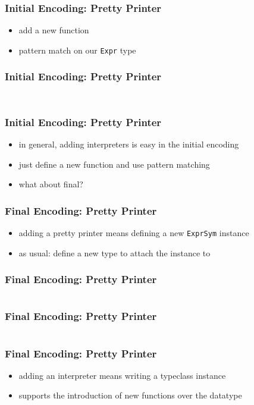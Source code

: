 \documentclass[aspectratio=169, hyperref={colorlinks, linkcolor=beamer@centricgreen}, urlcolor=links]{beamer}
\begin{document}
\begin{frame}
  \frametitle{Initial Encoding: Pretty Printer}
  \begin{itemize}
  \item add a new function
  \item pattern match on our \texttt{Expr} type
  \end{itemize}
\end{frame}

\begin{frame}
  \frametitle{Initial Encoding: Pretty Printer}
  \inputminted[fontsize=\footnotesize]{scala}{snippets/initial-tagless-pretty-print.scala}
  \vspace{5mm}
  \inputminted[fontsize=\footnotesize]{scala}{snippets/initial-tagless-pretty-print-example.scala}
\end{frame}

\begin{frame}
  \frametitle{Initial Encoding: Pretty Printer}
  \begin{itemize}
  \item in general, adding interpreters is easy in the initial encoding
  \item just define a new function and use pattern matching
  \item what about final?
  \end{itemize}
\end{frame}

\begin{frame}
  \frametitle{Final Encoding: Pretty Printer}
  \begin{itemize}
  \item adding a pretty printer means defining a new \texttt{ExprSym} instance
  \item as usual: define a new type to attach the instance to
  \end{itemize}
\end{frame}

\begin{frame}
  \frametitle{Final Encoding: Pretty Printer}
  \inputminted[fontsize=\footnotesize]{scala}{snippets/final-tagless-pretty-print.scala}
\end{frame}

\begin{frame}
  \frametitle{Final Encoding: Pretty Printer}
  \inputminted[fontsize=\footnotesize]{scala}{snippets/final-tagless-pretty-print-example.scala}
\end{frame}

\begin{frame}
  \frametitle{Final Encoding: Pretty Printer}
  \begin{itemize}
  \item adding an interpreter means writing a typeclass instance
  \item supports the introduction of new functions over the datatype
  \end{itemize}
\end{frame}
\end{document}
